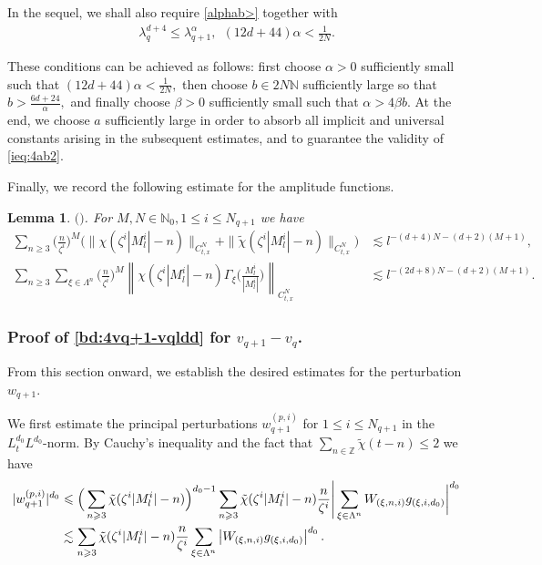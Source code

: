 \documentclass[UTF-8,reqno]{amsart}
\numberwithin{equation}{section}
\newtheorem{lemma}[theorem]{Lemma}
\theoremstyle{definition}
\def\({{\Big(}}
\def\){{\Big)}}
\newcommand{\norm}[1]{\left\|#1\right\|}
\def\geq{\geqslant}
\def\leq{\leqslant}
\def\({{\Big(}}
\def\){{\Big)}}
\def\bl{\begin{lemma}}
\def\el{\end{lemma}}
\def\geq{\geqslant}
\def\leq{\leqslant}
\begin{document}
In the sequel, we shall also require \eqref{alphab>} together with \begin{align}
   \lambda_{q}^{d+4}\leq\lambda_{q+1}^\alpha,\ \ (12d+44)\alpha<\frac1{2N}.
 \end{align} 
 
These conditions can be achieved as follows:
first choose $\alpha>0$ sufficiently small such that
$
(12d+44)\alpha<\frac1{2N},
$
then choose
$
b\in2N\mathbb{N}
$
sufficiently large so that
$
b>\frac{6d+24}{\alpha},
$
and finally choose $\beta>0$ sufficiently small such that
$
\alpha>4\beta b.
$
At the end, we choose $a$ sufficiently large in order to absorb all implicit and universal constants arising in the subsequent estimates, and to guarantee the validity of \eqref{ieq:4ab2}.


Finally, we record the following estimate for the amplitude functions.

\bl\label{lem:4chi}$($\cite[Proposition 5.2]{LRZ25}$)$.
 For $ M,N\in\mathbb{N}_0,1\leq i\leq N_{q+1}$  we have
\begin{align*}
    \sum_{n\geq3} \(\frac{n}{\zeta^i}\)^M\(\|\chi(\zeta^i|M^{i}_l|-n)\|_{C_{t,x}^N}+ \|\tilde{\chi}(\zeta^i|M^{i}_l|-n)\|_{C_{t,x}^N}\)&\lesssim l^{- (d+4)N-(d+2)(M+1)},\\
     \sum_{n\geq3}\sum_{\xi\in\Lambda^{n}}\(\frac{n}{\zeta^i}\)^M\norm{\chi(\zeta^i|M^{i}_l|-n)\Gamma_\xi\(\frac{M^{i}_l}{|M^{i}_l|}\)}_{C_{t,x}^N}& \lesssim l^{-(2d+8)N-(d+2)(M+1)}.
\end{align*}
\el 

\subsubsection{Proof of  \eqref{bd:4vq+1-vqldd}  for $v_{q+1}-v_q$.}
From this section onward, we establish the desired estimates for the perturbation $w_{q+1}$.

We first estimate the principal perturbations $w_{q+1}^{(p,i)}$ for   $1\leq i\leq N_{q+1}$ in the $L_t^{d_0}L^{d_0}$-norm. By Cauchy's inequality and the fact that $\sum_{n\in\mathbb{Z}} \tilde{\chi}(t - n) \leq2$  we have
\begin{align}
|w_{q+1}^{(p,i)}|^{d_0}&\leq\(\sum_{n\geq3}\tilde{\chi}(\zeta^{i}|M^{i}_l|-n)\)^{d_0-1}\sum_{n\geq3}\tilde{\chi}(\zeta^{i}|M^{i}_l|-n)\frac{n}{\zeta^{i}}\Bigg{|}\sum_{\xi\in\Lambda^{n}}W_{(\xi,n,i)}g_{(\xi,i,d_0)}\bigg{|}^{d_0}\notag\\ 
&\lesssim \sum_{n\geq3}\tilde{\chi}(\zeta^{i}|M^{i}_l|-n)\frac{n}{\zeta^{i}}\sum_{\xi\in\Lambda^{n}}\left|W_{(\xi,n,i)}g_{(\xi,i,d_0)}\right|^{d_0}.\notag
\end{align} 
\end{document}
